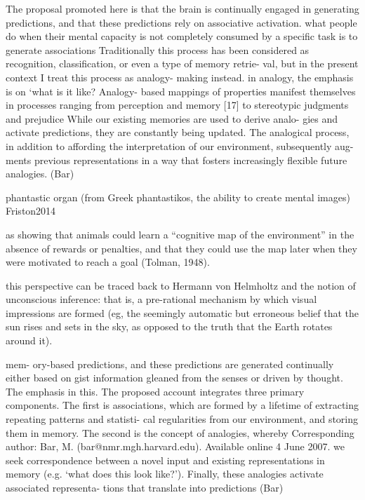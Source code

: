 \documentclass{article} %
\begin{document}
The proposal promoted here is that the brain is continually engaged in generating predictions, and that these predictions rely on associative activation. 
what people do when their mental capacity is not completely consumed by a specific task is to generate associations
Traditionally this process has been considered as recognition, classification, or even a type of memory retrie- val, but in the present context I treat this process as analogy- making instead. 
in analogy, the emphasis is on ‘what is it like?
Analogy- based mappings of properties manifest themselves in processes ranging from perception and memory [17] to stereotypic judgments and prejudice
While our existing memories are used to derive analo- gies and activate predictions, they are constantly being updated. The analogical process, in addition to affording the interpretation of our environment, subsequently aug- ments previous representations in a way that fosters increasingly flexible future analogies.
(Bar)

phantastic organ (from Greek phantastikos, the ability to create mental images)
Friston2014

as showing that animals could learn a “cognitive map of the environment” in the absence of rewards or penalties, and that they could use the map later when they were motivated to reach a goal (Tolman, 1948). 

this perspective can be traced back to Hermann von Helmholtz and the notion of unconscious inference: that is, a pre-rational mechanism by which visual impressions are formed (eg, the seemingly automatic but erroneous belief that the sun rises and sets in the sky, as opposed to the truth that the Earth rotates around it).

mem- ory-based predictions, and these predictions are generated continually either based on gist information gleaned from the senses or driven by thought. The emphasis in this.
The proposed account integrates three primary components. The first is associations, which are formed by a lifetime of extracting repeating patterns and statisti- cal regularities from our environment, and storing them in memory. The second is the concept of analogies, whereby
Corresponding author: Bar, M. (bar@nmr.mgh.harvard.edu). Available online 4 June 2007.
we seek correspondence between a novel input and existing representations in memory (e.g. ‘what does this look like?’). Finally, these analogies activate associated representa- tions that translate into predictions 
(Bar)
\end{document}
